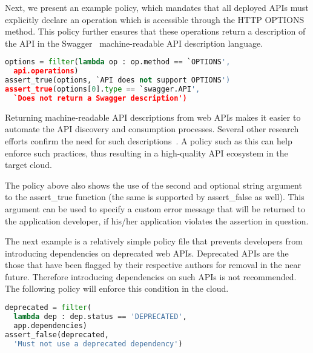 Next, we present an example policy, which mandates that all deployed APIs must explicitly
declare an operation which is accessible through the HTTP OPTIONS method. This policy further ensures
that these operations return a description of the API in the Swagger~\cite{hl:swagger} machine-readable API
description language.

\vspace{0.05in}
{\footnotesize
\begin{lstlisting}[language=Python, frame=single, showstringspaces=false]
options = filter(lambda op : op.method == `OPTIONS',  
  api.operations)
assert_true(options, `API does not support OPTIONS')
assert_true(options[0].type == `swagger.API', 
  `Does not return a Swagger description')
\end{lstlisting}
}
\vspace{0.05in}

Returning machine-readable API descriptions from web APIs 
makes it easier to automate the API discovery and consumption processes. Several other
research efforts confirm the need for such descriptions~\cite{Verborgh:2012:FDB:2307819.2307828,Steiner:2011:FHC:1967428.1967433}. 
A policy such as this
can help enforce such practices, thus resulting in a high-quality
API ecosystem in the target cloud. 

The policy above also shows the use of the second and
optional string argument to 
the assert\_true function (the same is supported by assert\_false as well). 
This argument can be used to specify
a custom error message that will be returned to the application developer, if his/her application
violates the assertion in question.

The next example is a relatively simple policy file 
that prevents developers from introducing
dependencies on deprecated web APIs. Deprecated APIs 
are the those that have been flagged
by their respective authors for removal 
in the near future. Therefore introducing dependencies on such
APIs is not recommended. The following policy will 
enforce this condition in the cloud.

\vspace{0.05in}
{\footnotesize
\begin{lstlisting}[language=Python, frame=single, showstringspaces=false]
deprecated = filter(
  lambda dep : dep.status == 'DEPRECATED', 
  app.dependencies)
assert_false(deprecated, 
  'Must not use a deprecated dependency')
\end{lstlisting}
}
\vspace{0.05in}

